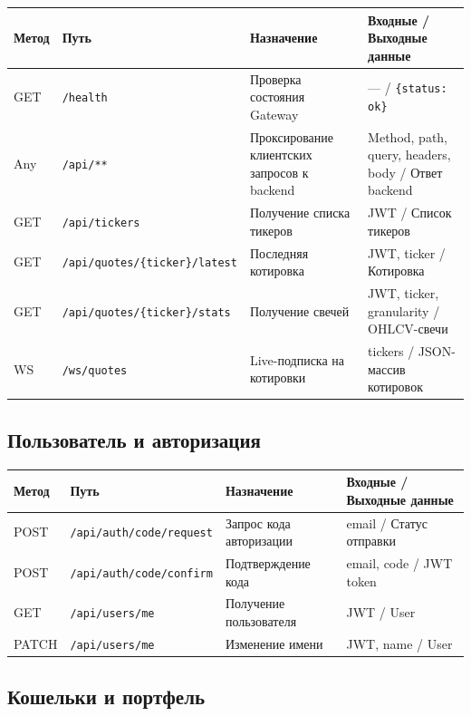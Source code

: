 \documentclass[12pt,a4paper]{article}
\begin{document}
\begin{longtable}{p{1.5cm}p{4cm}p{4cm}p{5cm}}
\toprule
\textbf{Метод} & \textbf{Путь} & \textbf{Назначение} & \textbf{Входные / Выходные данные} \\
\midrule
\endhead
GET & \texttt{/health} & Проверка состояния Gateway & --- / \texttt{\{status: ok\}} \\
Any & \texttt{/api/**} & Проксирование клиентских запросов к backend & Method, path, query, headers, body / Ответ backend \\
GET & \texttt{/api/tickers} & Получение списка тикеров & JWT / Список тикеров \\
GET & \texttt{/api/quotes/\{ticker\}/latest} & Последняя котировка & JWT, ticker / Котировка \\
GET & \texttt{/api/quotes/\{ticker\}/stats} & Получение свечей & JWT, ticker, granularity / OHLCV-свечи \\
WS & \texttt{/ws/quotes} & Live-подписка на котировки & tickers / JSON-массив котировок \\
\bottomrule
\end{longtable}

\subsection{Пользователь и авторизация}

\begin{longtable}{p{1.5cm}p{4cm}p{4cm}p{5cm}}
\toprule
\textbf{Метод} & \textbf{Путь} & \textbf{Назначение} & \textbf{Входные / Выходные данные} \\
\midrule
\endhead
POST & \texttt{/api/auth/code/request} & Запрос кода авторизации & email / Статус отправки \\
POST & \texttt{/api/auth/code/confirm} & Подтверждение кода & email, code / JWT token \\
GET & \texttt{/api/users/me} & Получение пользователя & JWT / User \\
PATCH & \texttt{/api/users/me} & Изменение имени & JWT, name / User \\
\bottomrule
\end{longtable}

\subsection{Кошельки и портфель}
\end{document}
